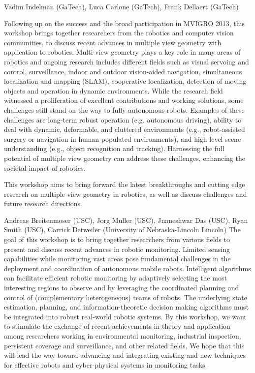 \begin{spacing}{1.0}
{Vadim Indelman (GaTech), Luca Carlone (GaTech), Frank Dellaert (GaTech)}
{
Following up on the success and the broad participation in MVIGRO 2013, this workshop brings together researchers from the robotics and computer vision communities, to discuss recent advances in multiple view geometry with application to robotics. Multi-view geometry plays a key role in many areas of robotics and ongoing research includes different fields such as visual servoing and control, surveillance, indoor and outdoor vision-aided navigation, simultaneous localization and mapping (SLAM), cooperative localization, detection of moving objects and operation in dynamic environments. While the research field witnessed a proliferation of excellent contributions and working solutions, some challenges still stand on the way to fully autonomous robots. Examples of these challenges are long-term robust operation (e.g. autonomous driving), ability to deal with dynamic, deformable, and cluttered environments (e.g., robot-assisted surgery or navigation in human populated environments), and high level scene understanding (e.g., object recognition and tracking). Harnessing the full potential of multiple view geometry can address these challenges, enhancing the societal impact of robotics. 

This workshop aims to bring forward the latest breakthroughs and cutting edge research on multiple view geometry in robotics, as well as discuss challenges and future research directions. 
}


{Andreas Breitenmoser (USC), Jorg Muller (USC), Jnaneshwar Das (USC), Ryan Smith (USC), Carrick Detweiler (University of Nebraska-Lincoln Lincoln)}
{
The goal of this workshop is to bring together researchers from various fields to present and discuss recent advances in robotic monitoring. Limited sensing capabilities while monitoring vast areas pose fundamental challenges in the deployment and coordination of autonomous mobile robots. Intelligent algorithms can facilitate efficient robotic monitoring by adaptively selecting the most interesting regions to observe and by leveraging the coordinated planning and control of (complementary heterogeneous) teams of robots. The underlying state estimation, planning, and information-theoretic decision making algorithms must be integrated into robust real-world robotic systems. By this workshop, we want to stimulate the exchange of recent achievements in theory and application among researchers working in environmental monitoring, industrial inspection, persistent coverage and surveillance, and other related fields. We hope that this will lead the way toward advancing and integrating existing and new techniques for effective robots and cyber-physical systems in monitoring tasks.
}

\clearpage


\end{spacing}
